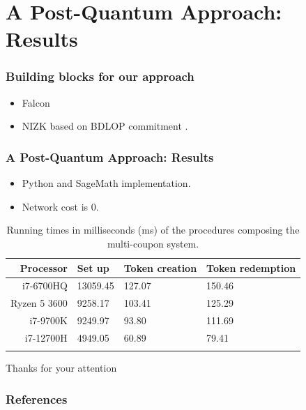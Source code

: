 \documentclass[presentation]{beamer}
\begin{document}
\section{A Post-Quantum Approach: Results}
\begin{frame}
  \frametitle{Building blocks for our approach}
  \begin{itemize}
    \item Falcon \cite{falcon20}
    \item NIZK based on BDLOP commitment \cite{nizk}.
  \end{itemize}
\end{frame}
\begin{frame}
  \frametitle{A Post-Quantum Approach: Results}
  \begin{itemize}
    \item Python and SageMath implementation.
    \item Network cost is 0.
  \end{itemize}
  \begin{table}[!h]
    \caption{Running times in milliseconds (ms) of the procedures composing the multi-coupon system.}\label{tab:results}
    \centering
    \begin{tabular}[c]{r|lll}
      \toprule
      Processor & Set up & Token creation & Token redemption \\
      \midrule
      i7-6700HQ    & 13059.45 & 127.07 & 150.46 \\
      Ryzen 5 3600 & 9258.17 & 103.41 & 125.29 \\
      i7-9700K     & 9249.97 & 93.80 & 111.69 \\
      i7-12700H    & 4949.05 & 60.89 & 79.41 \\
      \botrule
    \end{tabular}
  \end{table}
\end{frame}
\begin{frame}
  \huge{Thanks for your attention}
\end{frame}

\begin{frame}[allowframebreaks]
  \frametitle{References}
  
  
\end{frame}
\end{document}

